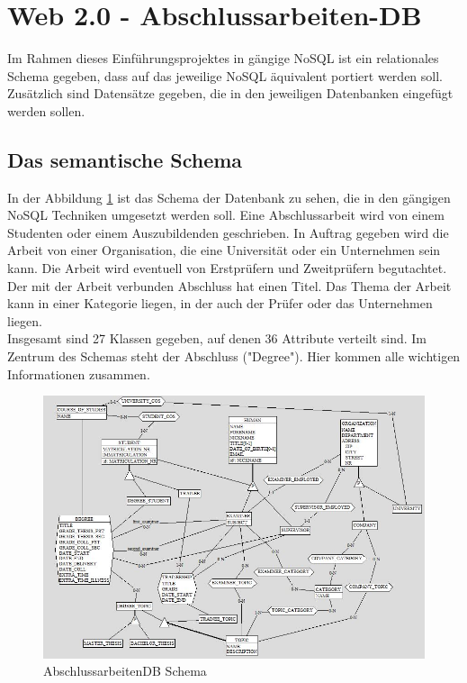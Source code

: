 \section{Web 2.0 - Abschlussarbeiten-DB}
Im Rahmen dieses Einführungsprojektes in gängige NoSQL ist ein relationales Schema gegeben, dass auf das jeweilige NoSQL äquivalent portiert werden soll. Zusätzlich sind Datensätze gegeben, die in den jeweiligen Datenbanken eingefügt werden sollen. 

\subsection{Das semantische Schema}
In der Abbildung \ref{fig:schema1} ist das Schema der Datenbank zu sehen, die in den gängigen NoSQL Techniken umgesetzt werden soll. Eine Abschlussarbeit wird von einem Studenten oder einem Auszubildenden geschrieben. In Auftrag gegeben wird die Arbeit von einer Organisation, die eine Universität oder ein Unternehmen sein kann. Die Arbeit wird eventuell von Erstprüfern und Zweitprüfern begutachtet. Der mit der Arbeit verbunden Abschluss hat einen Titel. Das Thema der Arbeit kann in einer Kategorie liegen, in der auch der Prüfer oder das Unternehmen liegen.\\

Insgesamt sind 27 Klassen gegeben, auf denen 36 Attribute verteilt sind. Im Zentrum des Schemas steht der Abschluss ("Degree"). Hier kommen alle wichtigen Informationen zusammen. \\

\begin{figure}[H]
	\centering
	\includegraphics[scale=0.6]{images/abschlussarbeitendbschema.jpg} 
	\caption{AbschlussarbeitenDB Schema}\label{fig:schema1}
\end{figure}

